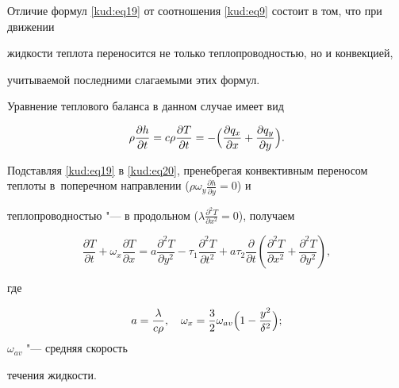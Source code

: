 Отличие формул \eqref{kud:eq19} от соотношения \eqref{kud:eq9} состоит в том, что при движении

жидкости теплота переносится не только теплопроводностью, но и конвекцией,

учитываемой последними слагаемыми этих формул.



Уравнение теплового баланса в данном случае имеет вид

\begin{equation}

\label{kud:eq20}

\rho\frac{\partial h}{\partial t}=

c\rho  \frac{\partial T}{\partial t}=

-\Bigl( \frac{\partial q_x

}{\partial x}+\frac{\partial q_y}{\partial y} \Bigr).

\end{equation}





Подставляя \eqref{kud:eq19} в \eqref{kud:eq20}, пренебрегая конвективным переносом теплоты в~поперечном направлении ($\rho \omega_y \frac{\partial h}{\partial y}=0$) и

теплопроводностью "--- в продольном ($ \lambda \frac{\partial^2T}{\partial

x^2}=0$), получаем

\begin{equation}

\label{kud:eq21}

\frac{\partial T}{\partial t}+ {\omega}_x \frac{\partial T}{\partial

x}=a\frac{\partial^2T}{\partial y^2}- \tau_1 \frac{\partial

^2T}{\partial t^2}+a \tau_2 \frac{\partial }{\partial t}\left(

\frac{\partial ^2T}{\partial x^2}+\frac{\partial ^2T}{\partial y^2}

\right),

\end{equation}

где 

$$a= \frac{\lambda}{c\rho},\quad \omega_x=\frac{3}{2} \omega_{av} \Bigl( 1-\frac{y^2}{\delta ^2}\Bigr);$$ $\omega_{av}$ "--- средняя скорость

течения жидкости.







